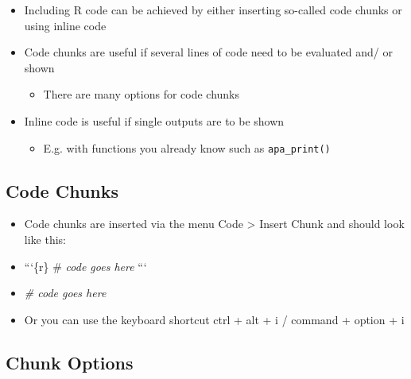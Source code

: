 \documentclass[
]{book}
\newenvironment{Shaded}{\begin{snugshade}}{\end{snugshade}}
\newcommand{\CommentTok}[1]{\textcolor[rgb]{0.56,0.35,0.01}{\textit{#1}}}
\providecommand{\tightlist}{%
  \setlength{\itemsep}{0pt}\setlength{\parskip}{0pt}}
\begin{document}
\begin{itemize}
\tightlist
\item
  Including R code can be achieved by either inserting so-called code chunks or using inline code
\item
  Code chunks are useful if several lines of code need to be evaluated and/ or shown

  \begin{itemize}
  \tightlist
  \item
    There are many options for code chunks
  \end{itemize}
\item
  Inline code is useful if single outputs are to be shown

  \begin{itemize}
  \tightlist
  \item
    E.g. with functions you already know such as \texttt{apa\_print()}
  \end{itemize}
\end{itemize}

\subsection{Code Chunks}\label{code-chunks}

\begin{itemize}
\item
  Code chunks are inserted via the menu Code \textgreater{} Insert Chunk and should look like this:
\item
  ```\{r\}
  \# \emph{code goes here}
  ```
\item
\begin{Shaded}
\begin{Highlighting}[]
\CommentTok{\# code goes here}
\end{Highlighting}
\end{Shaded}
\item
  Or you can use the keyboard shortcut ctrl + alt + i / command + option + i
\end{itemize}

\subsection{Chunk Options}\label{chunk-options}
\end{document}
